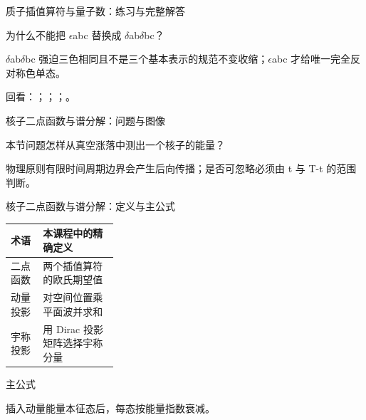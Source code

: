 \begin{frame}[t]{质子插值算符与量子数：练习与完整解答}
\footnotesize
\begin{block}{}为什么不能把 \ensuremath{\epsilon}abc 替换成 \ensuremath{\delta}ab\ensuremath{\delta}bc？\end{block}
\begin{exampleblock}{}\ensuremath{\delta}ab\ensuremath{\delta}bc 强迫三色相同且不是三个基本表示的规范不变收缩；\ensuremath{\epsilon}abc 才给唯一完全反对称色单态。\end{exampleblock}
\vfill
\scriptsize 回看：；；；。
\end{frame}

\begin{frame}[t]{核子二点函数与谱分解：问题与图像}
\footnotesize
\begin{block}{本节问题}怎样从真空涨落中测出一个核子的能量？\end{block}
\begin{block}{物理原则}\quad 有限时间周期边界会产生后向传播；是否可忽略必须由 t 与 T-t 的范围判断。\end{block}
\end{frame}

\begin{frame}[t]{核子二点函数与谱分解：定义与主公式}
\footnotesize\begin{tabularx}{\linewidth}{p{0.30\linewidth}Y}
\toprule 术语 & 本课程中的精确定义\\\midrule
{} 二点函数 & 两个插值算符的欧氏期望值\\
 动量投影 & 对空间位置乘平面波并求和\\
 宇称投影 & 用 Dirac 投影矩阵选择宇称分量\\
\bottomrule\end{tabularx}\vspace{0.15cm}
\begin{block}{ 主公式}\centering{}\end{block}
插入动量能量本征态后，每态按能量指数衰减。
\end{frame}

